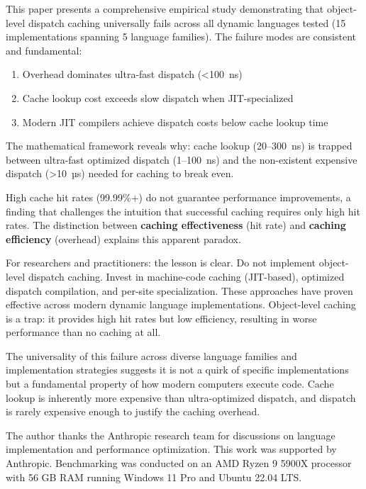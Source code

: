\documentclass[sigplan,final]{acmart}
\begin{document}
This paper presents a comprehensive empirical study demonstrating that object-level dispatch
caching universally fails across all dynamic languages tested (15 implementations spanning 5
language families). The failure modes are consistent and fundamental:

\begin{enumerate}
  \item Overhead dominates ultra-fast dispatch (<100~ns)
  \item Cache lookup cost exceeds slow dispatch when JIT-specialized
  \item Modern JIT compilers achieve dispatch costs below cache lookup time
\end{enumerate}

The mathematical framework reveals why: cache lookup (20--300~ns) is trapped between ultra-fast
optimized dispatch (1--100~ns) and the non-existent expensive dispatch (>10~µs) needed for
caching to break even.

High cache hit rates (99.99\%+) do not guarantee performance improvements, a finding that
challenges the intuition that successful caching requires only high hit rates. The distinction
between \textbf{caching effectiveness} (hit rate) and \textbf{caching efficiency} (overhead)
explains this apparent paradox.

For researchers and practitioners: the lesson is clear. Do not implement object-level dispatch
caching. Invest in machine-code caching (JIT-based), optimized dispatch compilation, and
per-site specialization. These approaches have proven effective across modern dynamic language
implementations. Object-level caching is a trap: it provides high hit rates but low efficiency,
resulting in worse performance than no caching at all.

The universality of this failure across diverse language families and implementation strategies
suggests it is not a quirk of specific implementations but a fundamental property of how modern
computers execute code. Cache lookup is inherently more expensive than ultra-optimized dispatch,
and dispatch is rarely expensive enough to justify the caching overhead.

\begin{acks}
The author thanks the Anthropic research team for discussions on language implementation and
performance optimization. This work was supported by Anthropic. Benchmarking was conducted on
an AMD Ryzen 9 5900X processor with 56 GB RAM running Windows 11 Pro and Ubuntu 22.04 LTS.
\end{acks}



\end{document}
